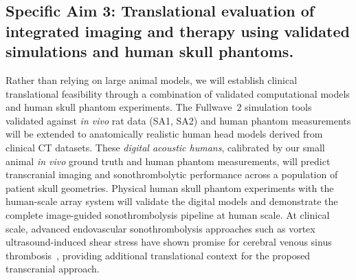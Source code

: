\subsection{Specific Aim 3: Translational evaluation of integrated imaging and therapy using validated simulations and human skull phantoms.}
Rather than relying on large animal models, we will establish clinical translational feasibility through a combination of validated computational models and human skull phantom experiments. The Fullwave~2 simulation tools validated against \textit{in vivo} rat data (SA1, SA2) and human phantom measurements will be extended to anatomically realistic human head models derived from clinical CT datasets. These \textit{digital acoustic humans}, calibrated by our small animal \textit{in vivo} ground truth and human phantom measurements, will predict transcranial imaging and sonothrombolytic performance across a population of patient skull geometries. Physical human skull phantom experiments with the human-scale array system will validate the digital models and demonstrate the complete image-guided sonothrombolysis pipeline at human scale. At clinical scale, advanced endovascular sonothrombolysis approaches such as vortex ultrasound-induced shear stress have shown promise for cerebral venous sinus thrombosis~\cite{zhang2023model}, providing additional translational context for the proposed transcranial approach.

